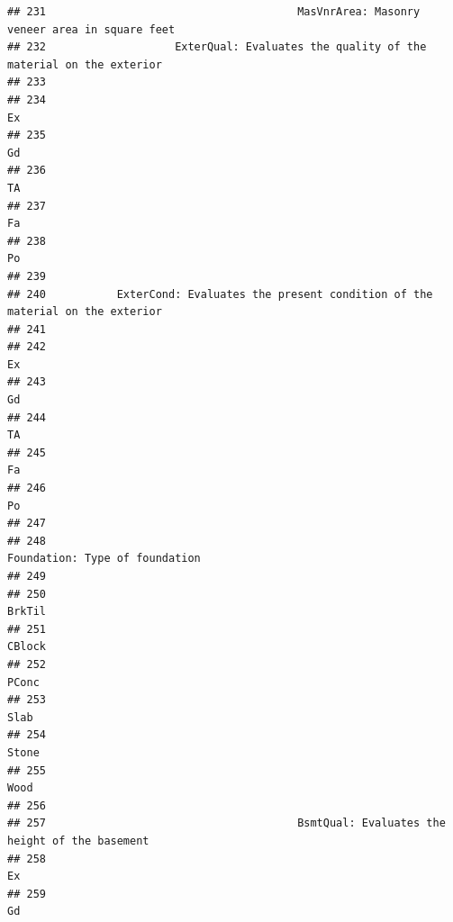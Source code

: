 \documentclass[
]{article}
\begin{document}
\begin{verbatim}
## 231                                       MasVnrArea: Masonry veneer area in square feet
## 232                    ExterQual: Evaluates the quality of the material on the exterior 
## 233                                                                                     
## 234                                                                                   Ex
## 235                                                                                   Gd
## 236                                                                                   TA
## 237                                                                                   Fa
## 238                                                                                   Po
## 239                                                                                     
## 240           ExterCond: Evaluates the present condition of the material on the exterior
## 241                                                                                     
## 242                                                                                   Ex
## 243                                                                                   Gd
## 244                                                                                   TA
## 245                                                                                   Fa
## 246                                                                                   Po
## 247                                                                                     
## 248                                                       Foundation: Type of foundation
## 249                                                                                     
## 250                                                                               BrkTil
## 251                                                                               CBlock
## 252                                                                                PConc
## 253                                                                                 Slab
## 254                                                                                Stone
## 255                                                                                 Wood
## 256                                                                                     
## 257                                       BsmtQual: Evaluates the height of the basement
## 258                                                                                   Ex
## 259                                                                                   Gd

\end{verbatim}
\end{document}
